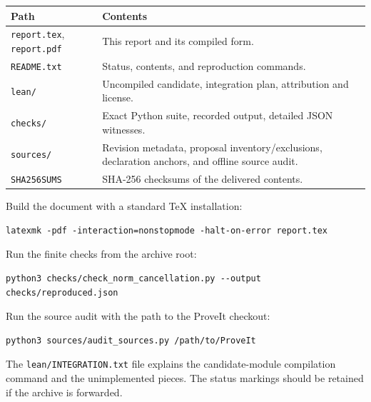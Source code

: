 \documentclass[11pt,letterpaper]{article}
\theoremstyle{remark}\newtheorem{remark}[theorem]{Remark}
\begin{document}
\begin{center}\small
\begin{tabularx}{\linewidth}{@{}lX@{}}
\toprule
Path & Contents\\\midrule
\texttt{report.tex}, \texttt{report.pdf} & This report and its compiled form.\\
\texttt{README.txt} & Status, contents, and reproduction commands.\\
\texttt{lean/} & Uncompiled candidate, integration plan, attribution and license.\\
\texttt{checks/} & Exact Python suite, recorded output, detailed JSON witnesses.\\
\texttt{sources/} & Revision metadata, proposal inventory/exclusions,
declaration anchors, and offline source audit.\\
\texttt{SHA256SUMS} & SHA-256 checksums of the delivered contents.\\
\bottomrule
\end{tabularx}
\end{center}

Build the document with a standard TeX installation:
\begin{verbatim}
latexmk -pdf -interaction=nonstopmode -halt-on-error report.tex
\end{verbatim}
Run the finite checks from the archive root:
\begin{verbatim}
python3 checks/check_norm_cancellation.py --output checks/reproduced.json
\end{verbatim}
Run the source audit with the path to the ProveIt checkout:
\begin{verbatim}
python3 sources/audit_sources.py /path/to/ProveIt
\end{verbatim}
The \texttt{lean/INTEGRATION.txt} file explains the candidate-module
compilation command and the unimplemented pieces. The status markings
should be retained if the archive is forwarded.
\end{document}

